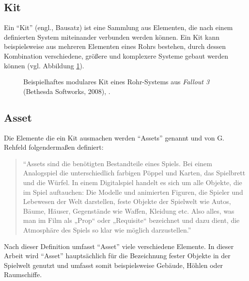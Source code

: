 \subsection{Kit}
Ein \enquote{Kit} (engl., Bausatz) ist eine Sammlung aus Elementen, die nach einem definierten System miteinander verbunden werden können. Ein Kit kann beispielsweise aus mehreren Elementen eines Rohrs bestehen, durch dessen Kombination verschiedene, größere und komplexere Systeme gebaut werden können (vgl. Abbildung \ref{pipes}). \parencite{Burgess}
\begin{figure}[H]
\centering
  \caption{Beispielhaftes modulares Kit eines Rohr-Systems aus \textit{Fallout 3} (Bethesda Softworks, 2008), \parencite{Burgess}.}
\label{pipes}
\end{figure}
\subsection{Asset}
Die Elemente die ein Kit ausmachen werden \enquote{Assets} genannt und von G. Rehfeld folgendermaßen definiert:
\begin{quote}
\enquote{Assets sind die benötigten Bestandteile eines Spiels. Bei einem Analogspiel die unterschiedlich farbigen Pöppel und Karten, das Spielbrett und die  Würfel. In einem Digitalspiel handelt es sich um alle Objekte, die im Spiel auftauchen: Die Modelle und animierten Figuren, die Spieler und Lebewesen der Welt darstellen, feste Objekte der Spielwelt wie Autos, Bäume, Häuser, Gegenstände wie Waffen, Kleidung etc. Also alles, was man im Film als „Prop“ oder „Requisite“ bezeichnet und dazu dient, die Atmosphäre des Spiels so klar wie möglich darzustellen.} \parencite[S.\,53-54]{rehfeld}
\end{quote}
Nach dieser Definition umfasst \enquote{Asset} viele verschiedene Elemente. In dieser Arbeit wird \enquote{Asset} hauptsächlich für die Bezeichnung fester Objekte in der Spielwelt genutzt und umfasst somit beispielsweise Gebäude, Höhlen oder Raumschiffe.
